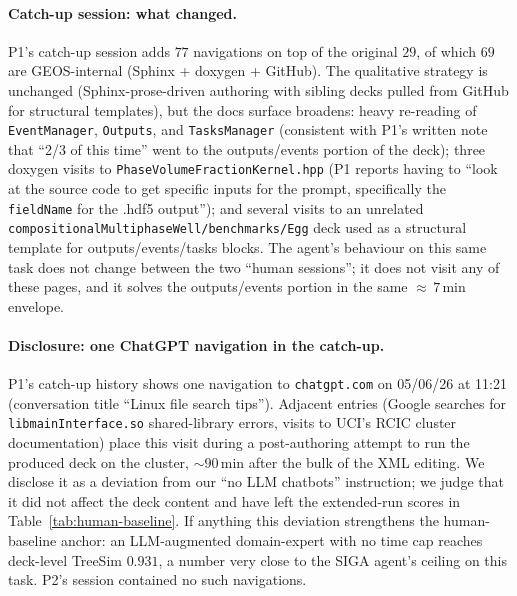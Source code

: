 \documentclass{article}
\begin{document}
\paragraph{Catch-up session: what changed.} P1's catch-up session adds $77$ navigations on top of the original $29$, of which $69$ are GEOS-internal (Sphinx + doxygen + GitHub). The qualitative strategy is unchanged (Sphinx-prose-driven authoring with sibling decks pulled from GitHub for structural templates), but the docs surface broadens: heavy re-reading of \texttt{EventManager}, \texttt{Outputs}, and \texttt{TasksManager} (consistent with P1's written note that ``2/3 of this time'' went to the outputs/events portion of the deck); three doxygen visits to \texttt{PhaseVolumeFractionKernel.hpp} (P1 reports having to ``look at the source code to get specific inputs for the prompt, specifically the \texttt{fieldName} for the .hdf5 output''); and several visits to an unrelated \texttt{compositionalMultiphaseWell/benchmarks/Egg} deck used as a structural template for outputs/events/tasks blocks. The agent's behaviour on this same task does not change between the two ``human sessions''; it does not visit any of these pages, and it solves the outputs/events portion in the same ${\approx}\,7\,$min envelope.

\paragraph{Disclosure: one ChatGPT navigation in the catch-up.} P1's catch-up history shows one navigation to \texttt{chatgpt.com} on 05/06/26 at 11:21 (conversation title ``Linux file search tips''). Adjacent entries (Google searches for \texttt{libmainInterface.so} shared-library errors, visits to UCI's RCIC cluster documentation) place this visit during a post-authoring attempt to run the produced deck on the cluster, ${\sim}90\,$min after the bulk of the XML editing. We disclose it as a deviation from our ``no LLM chatbots'' instruction; we judge that it did not affect the deck content and have left the extended-run scores in Table~\ref{tab:human-baseline}. If anything this deviation strengthens the human-baseline anchor: an LLM-augmented domain-expert with no time cap reaches deck-level TreeSim $0.931$, a number very close to the SIGA agent's ceiling on this task. P2's session contained no such navigations.
\end{document}
